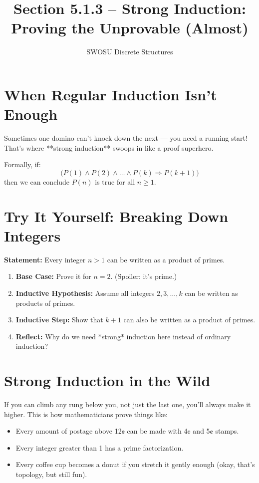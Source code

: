 \documentclass[12pt]{article}
\title{Section 5.1.3 – Strong Induction: Proving the Unprovable (Almost)}
\author{SWOSU Discrete Structures}
\date{}
\begin{document}
\maketitle

\section*{When Regular Induction Isn’t Enough}
Sometimes one domino can’t knock down the next — you need a running start!  
That’s where **strong induction** swoops in like a proof superhero.

Formally, if:
\[
\big( P(1)\wedge P(2)\wedge\dots\wedge P(k) \Rightarrow P(k+1) \big)
\]
then we can conclude \(P(n)\) is true for all \(n\ge1\).

\section*{Try It Yourself: Breaking Down Integers}
\textbf{Statement:} Every integer \(n>1\) can be written as a product of primes.

\begin{enumerate}[label=\alph*)]
\item \textbf{Base Case:} Prove it for \(n=2\). (Spoiler: it’s prime.)
\item \textbf{Inductive Hypothesis:}  
Assume all integers \(2,3,\dots,k\) can be written as products of primes.
\item \textbf{Inductive Step:}  
Show that \(k+1\) can also be written as a product of primes.
\item \textbf{Reflect:}  
Why do we need *strong* induction here instead of ordinary induction?
\end{enumerate}

\section*{Strong Induction in the Wild}
If you can climb any rung below you, not just the last one, you’ll always make it higher.  
This is how mathematicians prove things like:
\begin{itemize}
    \item Every amount of postage above 12¢ can be made with 4¢ and 5¢ stamps.
    \item Every integer greater than 1 has a prime factorization.
    \item Every coffee cup becomes a donut if you stretch it gently enough (okay, that’s topology, but still fun).
\end{itemize}

\begin{center}
\end{center}
\end{document}
